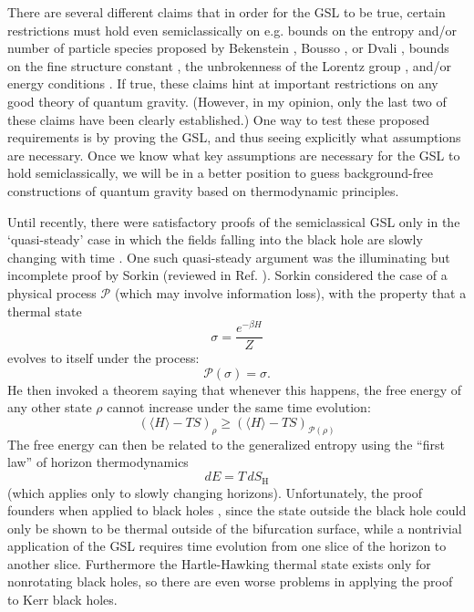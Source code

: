 \documentclass[12pt]{article}
\begin{document}
There are several different claims that in order for the GSL to be true, certain restrictions must hold even semiclassically on e.g. bounds on the entropy and/or number of particle species proposed by Bekenstein \cite{bek81b}, Bousso \cite{bousso02b}, or Dvali \cite{DS08}, bounds on the fine structure constant \cite{davies08}, the unbrokenness of the Lorentz group \cite{EFJW07}, and/or energy conditions \cite{anec}.  If true, these claims hint at important restrictions on any good theory of quantum gravity.  (However, in my opinion, only the last two of these claims have been clearly established.)  One way to test these proposed requirements is by proving the GSL, and thus seeing explicitly what assumptions are necessary.  Once we know what key assumptions are necessary for the GSL to hold semiclassically, we will be in a better position to guess background-free constructions of quantum gravity based on thermodynamic principles.

Until recently, there were satisfactory proofs of the semiclassical GSL only in the `quasi-steady' case in which the fields falling into the black hole are slowly changing with time \cite{10proofs}.  One such quasi-steady argument was the illuminating but incomplete proof by Sorkin \cite{sorkin98} (reviewed in Ref. \cite{10proofs}).  Sorkin considered the case of a physical process $\mathcal{P}$ (which may involve information loss), with the property that a thermal state
\begin{equation}
\sigma = \frac{e^{-\beta H}}{Z}
\end{equation}
evolves to itself under the process:
\begin{equation}
\mathcal{P}(\sigma) = \sigma.
\end{equation}
He then invoked a theorem saying that whenever this happens, the free energy of any other state $\rho$ cannot increase under the same time evolution:
\begin{equation}
(\langle H \rangle - TS)_\rho \ge (\langle H \rangle - TS)_{\mathcal{P}(\rho)}
\end{equation}
The free energy can then be related to the generalized entropy using the ``first law'' of horizon thermodynamics
\begin{equation}
dE = T\,dS_{\mathrm{H}}
\end{equation}
(which applies only to slowly changing horizons).  Unfortunately, the proof founders when applied to black holes \cite{10proofs}, since the state outside the black hole could only be shown to be thermal outside of the bifurcation surface, while a nontrivial application of the GSL requires time evolution from one slice of the horizon to another slice.  Furthermore the Hartle-Hawking thermal state exists only for nonrotating black holes, so there are even worse problems in applying the proof to Kerr black holes.
\end{document}
